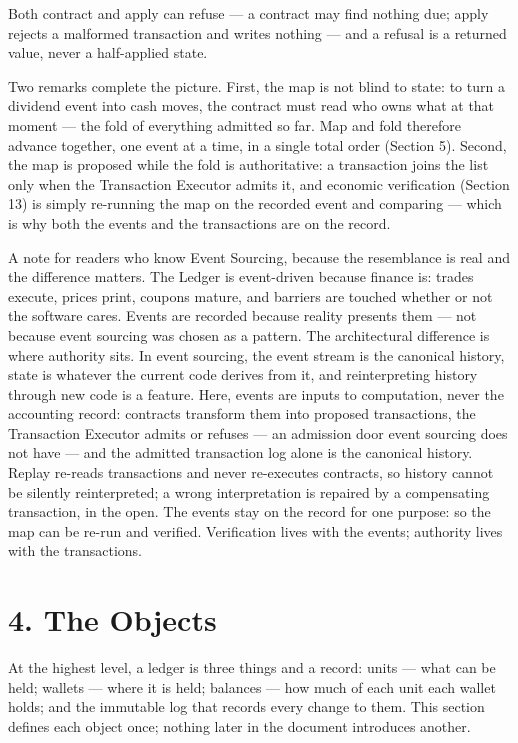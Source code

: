 \documentclass[11pt,a4paper]{article}
\begin{document}
Both contract and apply can refuse --- a contract may find nothing due;
apply rejects a malformed transaction and writes nothing --- and a
refusal is a returned value, never a half-applied state.

Two remarks complete the picture. First, the map is not blind to state:
to turn a dividend event into cash moves, the contract must read who
owns what at that moment --- the fold of everything admitted so far. Map
and fold therefore advance together, one event at a time, in a single
total order (Section 5). Second, the map is proposed while the fold is
authoritative: a transaction joins the list only when the Transaction
Executor admits it, and economic verification (Section 13) is simply
re-running the map on the recorded event and comparing --- which is why
both the events and the transactions are on the record.

A note for readers who know Event Sourcing, because the resemblance is
real and the difference matters. The Ledger is event-driven because
finance is: trades execute, prices print, coupons mature, and barriers
are touched whether or not the software cares. Events are recorded
because reality presents them --- not because event sourcing was chosen
as a pattern. The architectural difference is where authority sits. In
event sourcing, the event stream is the canonical history, state is
whatever the current code derives from it, and reinterpreting history
through new code is a feature. Here, events are inputs to computation,
never the accounting record: contracts transform them into proposed
transactions, the Transaction Executor admits or refuses --- an
admission door event sourcing does not have --- and the admitted
transaction log alone is the canonical history. Replay re-reads
transactions and never re-executes contracts, so history cannot be
silently reinterpreted; a wrong interpretation is repaired by a
compensating transaction, in the open. The events stay on the record for
one purpose: so the map can be re-run and verified. Verification lives
with the events; authority lives with the transactions.

\hypertarget{the-objects}{%
\section{4. The Objects}\label{the-objects}}

At the highest level, a ledger is three things and a record: units ---
what can be held; wallets --- where it is held; balances --- how much of
each unit each wallet holds; and the immutable log that records every
change to them. This section defines each object once; nothing later in
the document introduces another.
\end{document}
